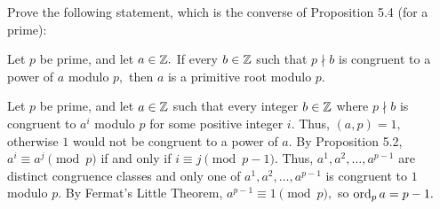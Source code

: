 \documentclass[handout]{ximera}
\begin{document}

\begin{br}
    Prove the following statement, which is the converse of Proposition 5.4 (for a prime):

    Let $p$ be prime, and let $a\in\mathbb Z.$ If every $b\in\mathbb Z$ such that $p\nmid b$ is congruent to a power of $a$ modulo $p,$ then ${a}$ is a primitive root modulo $p$.
    
    \begin{solution}
        Let $p$ be prime, and let $a\in\mathbb Z$ such that every integer $b\in\mathbb Z$ where $p\nmid b$ is congruent to $a^i$ modulo $p$ for some positive integer $i$. Thus, $(a,p)=1,$ otherwise $1$ would not be congruent to a power of $a$. By Proposition 5.2, $a^i\equiv a^j\pmod{p}$ if and only if $i\equiv j\pmod{p-1}.$ Thus, $a^1,a^2,\dots,a^{p-1}$ are distinct congruence classes and only one of $a^1,a^2,\dots,a^{p-1}$ is congruent to $1$ modulo $p.$ By Fermat's Little Theorem, $a^{p-1}\equiv1\pmod{p},$ so $\operatorname{ord}_p a=p-1.$
    \end{solution}
\end{br}
\end{document}
